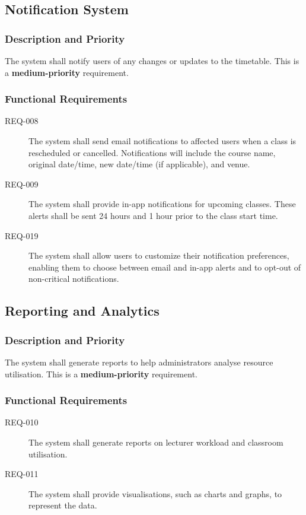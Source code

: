 \documentclass[11pt, a4paper]{article}
\begin{document}
\subsection{Notification System}
\label{sec:notifications}
\subsubsection{Description and Priority}
The system shall notify users of any changes or updates to the timetable. This is a \textbf{medium-priority} requirement.

\subsubsection{Functional Requirements}
\begin{description}
    \item[REQ-008] The system shall send email notifications to affected users when a class is rescheduled or cancelled. Notifications will include the course name, original date/time, new date/time (if applicable), and venue.
    \item[REQ-009] The system shall provide in-app notifications for upcoming classes. These alerts shall be sent 24 hours and 1 hour prior to the class start time.
    \item[REQ-019] The system shall allow users to customize their notification preferences, enabling them to choose between email and in-app alerts and to opt-out of non-critical notifications.
\end{description}

\subsection{Reporting and Analytics}
\label{sec:reporting}
\subsubsection{Description and Priority}
The system shall generate reports to help administrators analyse resource utilisation. This is a \textbf{medium-priority} requirement.

\subsubsection{Functional Requirements}
\begin{description}
    \item[REQ-010] The system shall generate reports on lecturer workload and classroom utilisation.
    \item[REQ-011] The system shall provide visualisations, such as charts and graphs, to represent the data.
\end{description}
\end{document}
